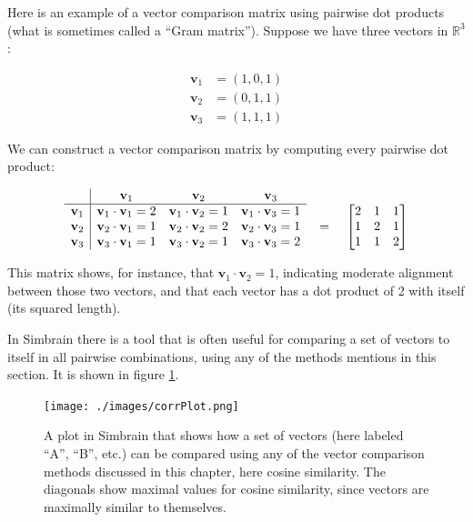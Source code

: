 Here is an example of a vector comparison matrix using pairwise dot products (what is sometimes called a ``Gram matrix''). Suppose we have three vectors in \( \mathbb{R}^3 \):

\begin{align*}
\mathbf{v}_1 &= (1,0,1) \\
\mathbf{v}_2 &= (0,1,1) \\
\mathbf{v}_3 &= (1,1,1)
\end{align*}

We can construct a vector comparison matrix by computing every pairwise dot product:

\[
\begin{array}{c|ccc}
 & \mathbf{v}_1 & \mathbf{v}_2 & \mathbf{v}_3 \\
\hline
\mathbf{v}_1 & \mathbf{v}_1 \cdot \mathbf{v}_1 = 2 & \mathbf{v}_1 \cdot \mathbf{v}_2 = 1 & \mathbf{v}_1 \cdot \mathbf{v}_3 = 1 \\
\mathbf{v}_2 & \mathbf{v}_2 \cdot \mathbf{v}_1 = 1 & \mathbf{v}_2 \cdot \mathbf{v}_2 = 2 & \mathbf{v}_2 \cdot \mathbf{v}_3 = 1 \\
\mathbf{v}_3 & \mathbf{v}_3 \cdot \mathbf{v}_1 = 1 & \mathbf{v}_3 \cdot \mathbf{v}_2 = 1 & \mathbf{v}_3 \cdot \mathbf{v}_3 = 2 \\
\end{array}
\raisebox{-0.3\height}{%
\quad = \quad
$\begin{bmatrix}
2 & 1 & 1 \\
1 & 2 & 1 \\
1 & 1 & 2 \\
\end{bmatrix}$}
\]

This matrix shows, for instance, that \( \mathbf{v}_1 \cdot \mathbf{v}_2 = 1 \), indicating 
moderate alignment between those two vectors, and that each vector has a dot product of 2 
with itself (its squared length).

In Simbrain there is a tool that is often useful for comparing a set of vectors to itself in all pairwise combinations, using any of the  methods mentions in this section. It is shown in figure \ref{corrPlot}.

\begin{figure}[h]
\centering
\texttt{[image: ./images/corrPlot.png]}
\caption[Simbrain screenshot from Jeff Yoshimi.]{A plot in Simbrain that shows how a set of vectors (here labeled ``A'', ``B'', etc.) can be compared using any of the vector comparison methods discussed in this chapter, here cosine similarity. The diagonals show maximal values for cosine similarity, since vectors are maximally similar to themselves.}
\label{corrPlot}
\end{figure}

